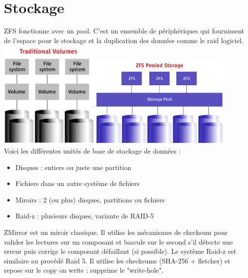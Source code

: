 \documentclass[a4paper]{report}
\begin{document}
	\section{Stockage}
	ZFS fonctionne avec un pool. C'est un ensemble de périphériques qui fournissent de l’espace pour le stockage et la duplication des données comme le raid logiciel. \\
	\includegraphics[width=5cm]{volumes_tradicionais.png}\includegraphics[width=7cm]{armazenamento_pooled_zfs.png}\\
	Voici les différentes unités de base de stockage de données :\\
	\begin{itemize}
		 \item Disques : entiers ou juste une partition
		 \item Fichiers dans un autre système de fichiers
		 \item Miroirs : 2 (ou plus) disques, partitions ou fichiers
		 \item Raid-z : plusieurs disques, variante de RAID-5\\
	\end{itemize}
	ZMirror est un miroir classique. Il utilise les mécanismes de checksum pour valider les lectures sur un composant et bascule sur le second s'il détecte une erreur puis corrige le composant défaillant (si possible). Le système Raid-z est similaire au procédé Raid 5. Il utilise les checksums (SHA-256 + fletcher) et repose sur le copy on write : supprime le "write-hole".
\end{document}
